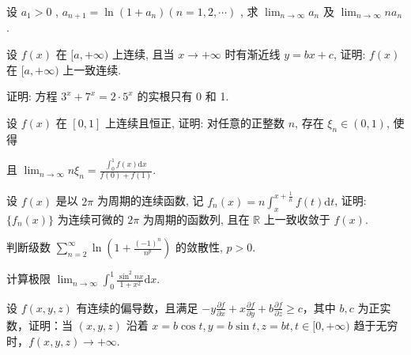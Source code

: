 设  $a_{1} > 0$ ,  $a_{n+1} = \ln(1 + a_{n}) (n = 1, 2, \cdots)$ , 求  $\lim_{n \to \infty} a_{n}$  及  $\lim_{n \to \infty} na_{n}$ .\par
设 $f(x)$ 在 $[a, +\infty)$ 上连续, 且当 $x \to +\infty$ 时有渐近线 $y = bx + c$, 证明: $f(x)$ 在 $[a, +\infty)$ 上一致连续.\par
证明: 方程 $3^{x} + 7^{x} = 2 \cdot 5^{x}$ 的实根只有 0 和 1.\par
\par{}
设 $f(x)$ 在 $[0,1]$ 上连续且恒正, 证明: 对任意的正整数 $n$, 存在 $\xi_n \in (0,1)$, 使得\par
\nopagebreak[4]
且 $\lim_{n\to \infty}n\xi_n = \frac{\int_0^1f(x)\mathrm{d}x}{f(0) + f(1)}.$\par
设 $f(x)$ 是以 $2\pi$ 为周期的连续函数, 记 $f_{n}(x) = n \int_{x}^{x + \frac{1}{n}} f(t) \mathrm{d}t$, 证明: $\{f_{n}(x)\}$ 为连续可微的 $2\pi$ 为周期的函数列, 且在 $\mathbb{R}$ 上一致收敛于 $f(x)$.\par
判断级数 $\sum_{n=2}^{\infty} \ln \left(1 + \frac{(-1)^n}{n^p}\right)$ 的敛散性, $p > 0$.\par
计算极限 $\lim_{n\to \infty}\int_0^1\frac{\sin^2nx}{1 + x^2}\mathrm{d}x.$\par
设 $f(x, y, z)$ 有连续的偏导数，且满足 $-y\frac{\partial f}{\partial x} + x\frac{\partial f}{\partial y} + b\frac{\partial f}{\partial z} \geq c$，其中 $b, c$ 为正实数，证明：当 $(x, y, z)$ 沿着 $x = b\cos t, y = b\sin t, z = bt, t \in [0, +\infty)$ 趋于无穷时，$f(x, y, z) \to +\infty$.\par
\par{}
